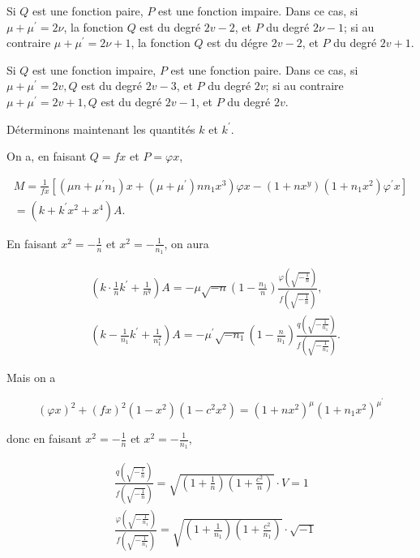 \documentclass{article}
\begin{document}
Si \(Q\) est une fonction paire, \(P\) est une fonction impaire. Dans ce cas, si \(\mu+\mu^{\prime}=2 \nu\), la fonction \(Q\) est du degré \(2 v-2\), et \(P\) du degré \(2 \nu-1\); si au contraire \(\mu+\mu^{\prime}=2 \nu+1\), la fonction \(Q\) est du dégre \(2 v-2\), et \(P\) du degré \(2 v+1\).

Si \(Q\) est une fonction impaire, \(P\) est une fonction paire. Dans ce cas, si \(\mu+\mu^{\prime}=2 v, Q\) est du degré \(2 v-3\), et \(P\) du degré \(2 v\); si au contraire \(\mu+\mu^{\prime}=2 v+1, Q\) est du degré \(2 v-1\), et \(P\) du degré \(2 v\).

Déterminons maintenant les quantités \(k\) et \(k^{\prime}\).

On a, en faisant \(Q=f x\) et \(P=\varphi x\),

\[
\begin{array}{r}
\left.M=\frac{1}{f x}\left[\left(\mu n+\mu^{\prime} n_{1}\right) x+\left(\mu+\mu^{\prime}\right) n n_{1} x^{3}\right) \varphi x-\left(1+n x^{y}\right)\left(1+n_{1} x^{2}\right) \varphi^{\prime} x\right] \\
=\left(k+k^{\prime} x^{2}+x^{4}\right) A .
\end{array}
\]

En faisant \(x^{2}=-\frac{1}{n}\) et \(x^{2}=-\frac{1}{n_{1}}\), on aura

\[
\begin{aligned}
& \left(k \cdot \frac{1}{n} k^{\prime}+\frac{1}{n^{q}}\right) A=-\mu \sqrt{-n}\left(1-\frac{n_{1}}{n}\right) \frac{\varphi\left(\sqrt{-\frac{1}{n}}\right)}{f\left(\sqrt{-\frac{1}{n}}\right)}, \\
& \left(k-\frac{1}{n_{1}} k^{\prime}+\frac{1}{n_{1}^{2}}\right) A=-\mu^{\prime} \sqrt{-n_{1}}\left(1-\frac{n}{n_{1}}\right) \frac{q\left(\sqrt{-\frac{1}{n_{1}}}\right)}{f\left(\sqrt{-\frac{1}{n_{1}}}\right)} .
\end{aligned}
\]

Mais on a

\[
(\varphi x)^{2}+(f x)^{2}\left(1-x^{2}\right)\left(1-c^{2} x^{2}\right)=\left(1+n x^{2}\right)^{\mu}\left(1+n_{1} x^{2}\right)^{\mu^{\prime}}
\]

donc en faisant \(x^{2}=-\frac{1}{n}\) et \(x^{2}=-\frac{1}{n_{1}}\),

\[
\begin{aligned}
& \frac{q\left(\sqrt{-\frac{1}{n}}\right)}{f\left(\sqrt{-\frac{1}{n}}\right)}=\sqrt{\left(1+\frac{1}{n}\right)\left(1+\frac{c^{2}}{n}\right)} \cdot V=1 \\
& \frac{\varphi\left(\sqrt{-\frac{1}{n_{1}}}\right)}{f\left(\sqrt{-\frac{1}{n_{1}}}\right)}=\sqrt{\left(1+\frac{1}{n_{1}}\right)\left(1+\frac{c^{2}}{n_{1}}\right)} \cdot \sqrt{-1}
\end{aligned}
\]
\end{document}
